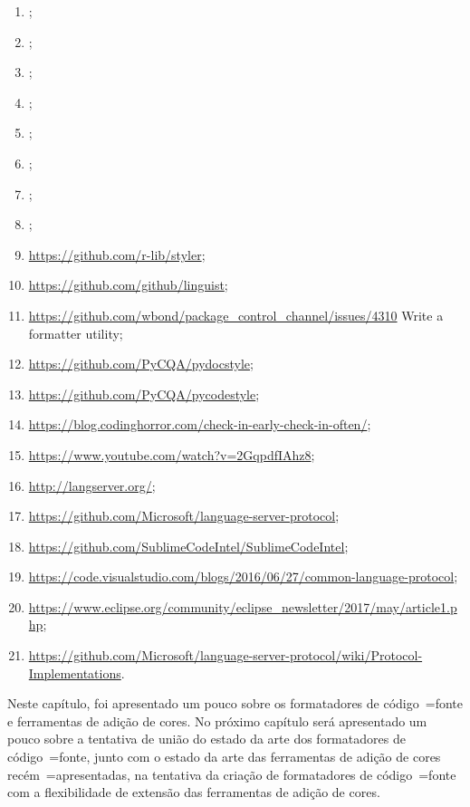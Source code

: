 {\begin{enumerate}
        \item {};
        \item {};
        \item {};
        \item {};
        \item {};
        \item {};
        \item {};
        \item {};
        \item \url{https://github.com/r-lib/styler};
        \item \url{https://github.com/github/linguist};
        \item \url{https://github.com/wbond/package_control_channel/issues/4310} Write a formatter utility;
        \item \url{https://github.com/PyCQA/pydocstyle};
        \item \url{https://github.com/PyCQA/pycodestyle};
        \item \url{https://blog.codinghorror.com/check-in-early-check-in-often/};
        \item \url{https://www.youtube.com/watch?v=2GqpdfIAhz8};
        \item \url{http://langserver.org/};
        \item \url{https://github.com/Microsoft/language-server-protocol};
        \item \url{https://github.com/SublimeCodeIntel/SublimeCodeIntel};
        \item \url{https://code.visualstudio.com/blogs/2016/06/27/common-language-protocol};
        \item \url{https://www.eclipse.org/community/eclipse_newsletter/2017/may/article1.php};
        \item \url{https://github.com/Microsoft/language-server-protocol/wiki/Protocol-Implementations}.
    \end{enumerate}
}

Neste capítulo,
foi apresentado um pouco sobre os formatadores de código~=fonte e
ferramentas de adição de cores.
No próximo capítulo será apresentado um pouco sobre a tentativa de união do estado da arte dos formatadores de código~=fonte,
junto com o estado da arte das ferramentas de adição de cores recém~=apresentadas,
na tentativa da criação de formatadores de código~=fonte com a flexibilidade de extensão das ferramentas de adição de cores.
